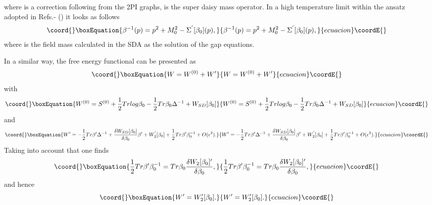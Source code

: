 \documentclass[a4paper,12pt]{article}
\begin{document}
where \coordHE{} is a correction following from the 2PI graphs,
\coordHE{} is the super daisy mass operator. In a high
temperature limit within the ansatz adopted in
Refs.\cite{Bordag1}-\cite{pl} (\coordHE{}) it looks as
follows
\begin{equation}\coord{}\boxEquation{ \label{be'}
\beta^{-1}(p) =  p^2 + M^2_0 - \Sigma^{'}[\beta_0](p),
}{ \beta^{-1}(p) =  p^2 + M^2_0 - \Sigma^{'}[\beta_0](p),
}{ecuacion}\coordE{}\end{equation}
where \coordHE{} is the field mass calculated in the SDA as the solution
of the gap equations.

In a similar way, the free energy functional can be presented as
\begin{equation}\coord{}\boxEquation{ \label{fe}
W = W^{(0)} + W'
}{ W = W^{(0)} + W'
}{ecuacion}\coordE{}\end{equation}
with
\begin{equation}\coord{}\boxEquation{ \label{fe0}
 W^{(0)} = S^{(0)} + \frac{1}{2} Tr log \beta_0 - \frac{1}{2} Tr
 \beta_0 \Delta^{-1} + W_{SD} [\beta_0]
}{ W^{(0)} = S^{(0)} + \frac{1}{2} Tr log \beta_0 - \frac{1}{2} Tr
 \beta_0 \Delta^{-1} + W_{SD} [\beta_0]
}{ecuacion}\coordE{}\end{equation}
and
\begin{equation}\coord{}\boxEquation{ \label{fe1}
 W' = - \frac{1}{2} Tr \beta ' \Delta^{-1} + \frac{\delta
 W_{SD}[\beta_0] }{\delta \beta_0} \beta {'} + W_2^{'}[\beta_0]
 +\frac{1}{2} Tr \beta ' \beta^{-1}_0 + O(\epsilon^2).
}{ W' = - \frac{1}{2} Tr \beta ' \Delta^{-1} + \frac{\delta
 W_{SD}[\beta_0] }{\delta \beta_0} \beta {'} + W_2^{'}[\beta_0]
 +\frac{1}{2} Tr \beta ' \beta^{-1}_0 + O(\epsilon^2).
}{ecuacion}\coordE{}\end{equation}
Taking into account that \coordHE{} one finds
\begin{equation}\coord{}\boxEquation{ \label{fe2}
\frac{1}{2} Tr \beta ' \beta^{-1}_0 = Tr \beta_0 \frac{\delta
W_{2}[\beta_0]' }{\delta \beta_0 },
}{ \frac{1}{2} Tr \beta ' \beta^{-1}_0 = Tr \beta_0 \frac{\delta
W_{2}[\beta_0]' }{\delta \beta_0 },
}{ecuacion}\coordE{}\end{equation}
and hence
\begin{equation}\coord{}\boxEquation{ \label{fe3}
W ' = W '_2[\beta_0].
}{ W ' = W '_2[\beta_0].
}{ecuacion}\coordE{}\end{equation}
\end{document}

